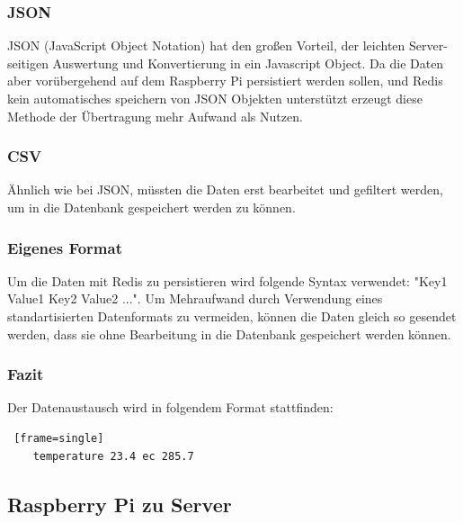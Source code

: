 \documentclass[11pt]{article}
\begin{document}
\subsubsection{JSON}
JSON (JavaScript Object Notation) hat den gro{\ss}en Vorteil, der leichten Server-seitigen Auswertung und Konvertierung in ein Javascript Object. Da die Daten aber vor\"ubergehend auf dem Raspberry Pi persistiert werden sollen, und Redis kein automatisches speichern von JSON Objekten unterst\"utzt erzeugt diese Methode der \"Ubertragung mehr Aufwand als Nutzen.
\subsubsection{CSV}
\"Ahnlich wie bei JSON, m\"ussten die Daten erst bearbeitet und gefiltert werden, um in die Datenbank gespeichert werden zu k\"onnen.
\subsubsection{Eigenes Format}
Um die Daten mit Redis zu persistieren wird folgende Syntax verwendet: "Key1 Value1 Key2 Value2 ...". Um Mehraufwand durch Verwendung eines standartisierten Datenformats zu vermeiden, k\"onnen die Daten gleich so gesendet werden, dass sie ohne Bearbeitung in die Datenbank gespeichert werden k\"onnen.
\subsubsection{Fazit}
Der Datenaustausch wird in folgendem Format stattfinden:
\begin{lstlisting} [frame=single]
	temperature 23.4 ec 285.7
\end{lstlisting}

\subsection{Raspberry Pi zu Server}
\end{document}
